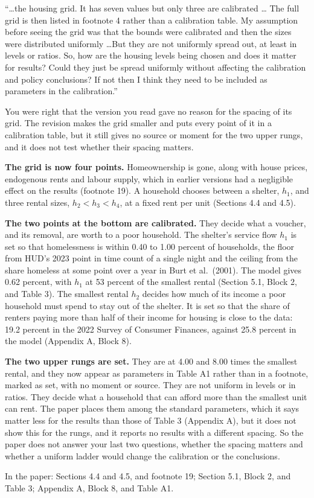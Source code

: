 \documentclass[11pt]{article}
\begin{document}
\begin{referee}
``\dots the housing grid. It has seven values but only three are calibrated \dots
The full grid is then listed in footnote 4 rather than a calibration table. My
assumption before seeing the grid was that the bounds were calibrated and then the
sizes were distributed uniformly \dots But they are not uniformly spread out, at
least in levels or ratios. So, how are the housing levels being chosen and does it
matter for results? Could they just be spread uniformly without affecting the
calibration and policy conclusions? If not then I think they need to be included as
parameters in the calibration.''
\end{referee}
\begin{response}
\concede \open You were right that the version you read gave no reason for the spacing of
its grid. The revision makes the grid smaller and puts every point of it in a calibration
table, but it still gives no source or moment for the two upper rungs, and it does not test
whether their spacing matters.

\textbf{The grid is now four points.} Homeownership is gone, along with house prices,
endogenous rents and labour supply, which in earlier versions had a negligible effect on
the results (footnote 19). A household chooses between a shelter, $h_1$, and three rental
sizes, $h_2<h_3<h_4$, at a fixed rent per unit (Sections 4.4 and 4.5).

\textbf{The two points at the bottom are calibrated.} They decide what a voucher, and its
removal, are worth to a poor household. The shelter's service flow $h_1$ is set so that
homelessness is within 0.40 to 1.00 percent of households, the floor from HUD's 2023 point
in time count of a single night and the ceiling from the share homeless at some point over
a year in Burt et al.\ (2001). The model gives 0.62 percent, with $h_1$ at 53 percent of the
smallest rental (Section 5.1, Block 2, and Table 3). The smallest rental $h_2$ decides how
much of its income a poor household must spend to stay out of the shelter. It is set so
that the share of renters paying more than half of their income for housing is close to
the data: 19.2 percent in the 2022 Survey of Consumer Finances, against 25.8 percent in the
model (Appendix A, Block 8).

\textbf{The two upper rungs are set.} They are at 4.00 and 8.00 times the smallest rental,
and they now appear as parameters in Table A1 rather than in a footnote, marked as set,
with no moment or source. They are not uniform in levels or in ratios. They decide what a
household that can afford more than the smallest unit can rent. The paper places them among
the standard parameters, which it says matter less for the results than those of Table 3
(Appendix A), but it does not show this for the rungs, and it reports no results with a
different spacing. So the paper does not answer your last two questions, whether the
spacing matters and whether a uniform ladder would change the calibration or the
conclusions.

In the paper: Sections 4.4 and 4.5, and footnote 19; Section 5.1, Block 2, and Table 3;
Appendix A, Block 8, and Table A1.
\end{response}
\end{document}
